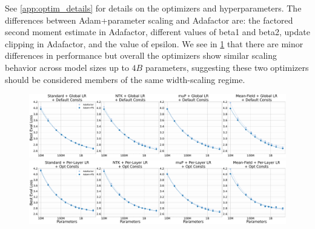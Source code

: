See \cref{app:optim_details} for details on the optimizers and hyperparameters. The differences between Adam+parameter scaling and Adafactor are: the factored second moment estimate in Adafactor, different values of beta1 and beta2, update clipping in Adafactor, and the value of epsilon. We see in \cref{fig:adafactor_cross_check} that there are minor differences in performance but overall the optimizers show similar scaling behavior across model sizes up to $4B$ parameters, suggesting these two optimizers should be considered members of the same width-scaling regime.

\vspace{48pt}
\begin{figure}[ht]
    \begin{center}
        \includegraphics[width=\linewidth, trim={0, 0, 0, 0},clip]{icml2024/figures/adafactor_cross_check/adafactor_cross_check+50k_steps.pdf}
       
        \figvspace

        \includegraphics[width=\linewidth, trim={0, 0, 0, 0},clip]{icml2024/figures/adafactor_cross_check/adafactor_cross_check+50k_steps_per_module_lr_optimal_constants.pdf}
        \caption{}
        \label{fig:adafactor_cross_check}
    \end{center}
\end{figure}

